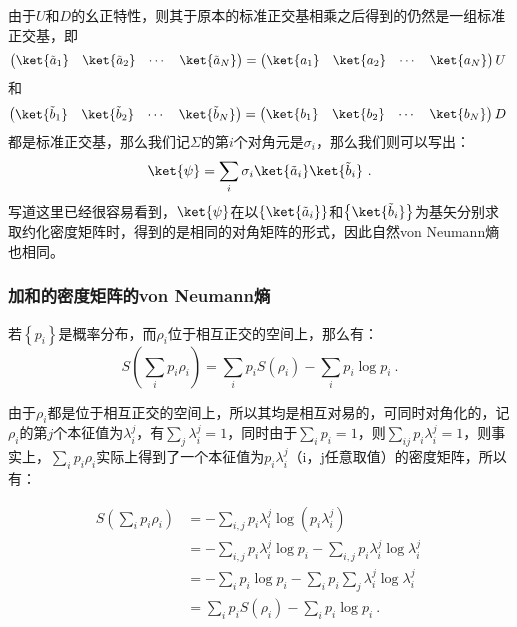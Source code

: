 由于$U$和$D$的幺正特性，则其于原本的标准正交基相乘之后得到的仍然是一组标准正交基，即
$$\begin{pmatrix}
\ket{\tilde{a}_1}&\ket{\tilde{a}_2} & \cdots & \ket{\tilde{a}_N}
\end{pmatrix} = 
\begin{pmatrix}
\ket{a_1}&\ket{a_2}&\cdots &\ket{a_N}
\end{pmatrix}U~$$
和
$$\begin{pmatrix}
\ket{\tilde{b}_1} & \ket{\tilde{b}_2} & \cdots & \ket{\tilde{b}_N}
\end{pmatrix} = \begin{pmatrix}
\ket{b_1}&\ket{b_2}& \cdots &\ket{b_N}
\end{pmatrix}D~$$
都是标准正交基，那么我们记$\Sigma$的第$i$个对角元是$\sigma_i$，那么我们则可以写出：
$$\ket{\psi} = \sum_i \sigma_i \ket{\tilde{a}_i}\ket{\tilde{b}_i}~.$$
写道这里已经很容易看到，$\ket{\psi}$在以$\left\{\ket{\tilde{a}_i}\right\}$和$\left\{\ket{\tilde{b}_i}\right\}$为基矢分别求取约化密度矩阵时，得到的是相同的对角矩阵的形式，因此自然von Neumann熵也相同。

\subsubsection{加和的密度矩阵的von Neumann熵}

若$\left\{p_i\right\}$是概率分布，而$\rho_i$位于相互正交的空间上，那么有：
$$S\left(\sum\limits_i p_i\rho_i\right) = \sum\limits_i p_i S\left(\rho_i\right) - \sum\limits_i p_i \log p_i~.$$

由于$\rho_i$都是位于相互正交的空间上，所以其均是相互对易的，可同时对角化的，记$\rho_i$的第$j$个本征值为$\lambda_i^j$，有$\sum\limits_j \lambda_i^j = 1$，同时由于$\sum\limits_i p_i = 1$，则$\sum\limits_{ij}p_i\lambda_i^j = 1$，则事实上，$\sum\limits_i p_i\rho_i$实际上得到了一个本征值为$p_i\lambda_i^j$（i，j任意取值）的密度矩阵，所以有：

\begin{equation}
\begin{aligned}
S\left( \sum_i p_i\rho_i \right) &= -\sum_{i,j}p_i\lambda_i^j\log\left(p_i \lambda_i^j\right) \\
&= -\sum_{i,j}p_i\lambda_i^j\log p_i - \sum_{i,j}p_i\lambda_i^j\log\lambda_i^j \\
&= -\sum_i p_i\log p_i - \sum_i p_i\sum_j\lambda_i^j\log\lambda_i^j \\
&= \sum_i p_i S\left(\rho_i\right) - \sum_i p_i\log p_i~.
\end{aligned}~
\end{equation}


